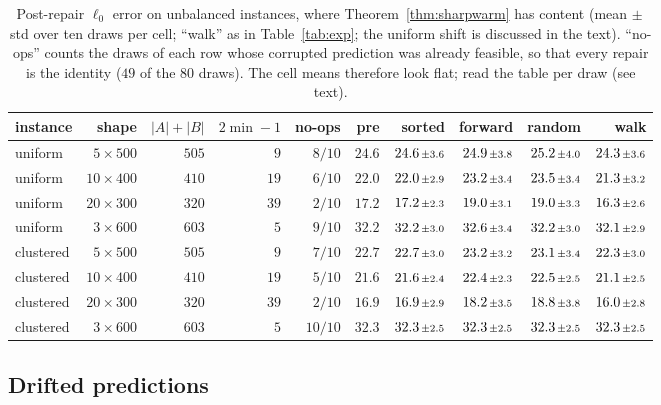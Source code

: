 \begin{table}[ht]
\centering
\caption{Post-repair $\ell_0$ error on unbalanced instances, where Theorem~\ref{thm:sharpwarm} has
content (mean ${\scriptstyle\pm}$\,std over ten draws per cell; ``walk'' as in
Table~\ref{tab:exp}; the uniform shift is discussed in the text). ``no-ops'' counts the draws of
each row whose corrupted prediction was already feasible, so that every repair is the identity
($49$ of the $80$ draws). The cell means therefore look flat; read the table per draw (see
text).}
\label{tab:rect}
\footnotesize
\setlength{\tabcolsep}{2.5pt}
\begin{tabular}{lrrrrrrrrr}
\toprule
instance & shape & $|A|{+}|B|$ & $2\min{-}1$ & no-ops & pre & sorted & forward & random & walk\\
\midrule
uniform & $5\times500$ & $505$ & $9$ & $8/10$ & $24.6$ & $24.6{\scriptstyle\,\pm3.6}$ & $24.9{\scriptstyle\,\pm3.8}$ & $25.2{\scriptstyle\,\pm4.0}$ & $24.3{\scriptstyle\,\pm3.6}$ \\
uniform & $10\times400$ & $410$ & $19$ & $6/10$ & $22.0$ & $22.0{\scriptstyle\,\pm2.9}$ & $23.2{\scriptstyle\,\pm3.4}$ & $23.5{\scriptstyle\,\pm3.4}$ & $21.3{\scriptstyle\,\pm3.2}$ \\
uniform & $20\times300$ & $320$ & $39$ & $2/10$ & $17.2$ & $17.2{\scriptstyle\,\pm2.3}$ & $19.0{\scriptstyle\,\pm3.1}$ & $19.0{\scriptstyle\,\pm3.3}$ & $16.3{\scriptstyle\,\pm2.6}$ \\
uniform & $3\times600$ & $603$ & $5$ & $9/10$ & $32.2$ & $32.2{\scriptstyle\,\pm3.0}$ & $32.6{\scriptstyle\,\pm3.4}$ & $32.2{\scriptstyle\,\pm3.0}$ & $32.1{\scriptstyle\,\pm2.9}$ \\
clustered & $5\times500$ & $505$ & $9$ & $7/10$ & $22.7$ & $22.7{\scriptstyle\,\pm3.0}$ & $23.2{\scriptstyle\,\pm3.2}$ & $23.1{\scriptstyle\,\pm3.4}$ & $22.3{\scriptstyle\,\pm3.0}$ \\
clustered & $10\times400$ & $410$ & $19$ & $5/10$ & $21.6$ & $21.6{\scriptstyle\,\pm2.4}$ & $22.4{\scriptstyle\,\pm2.3}$ & $22.5{\scriptstyle\,\pm2.5}$ & $21.1{\scriptstyle\,\pm2.5}$ \\
clustered & $20\times300$ & $320$ & $39$ & $2/10$ & $16.9$ & $16.9{\scriptstyle\,\pm2.9}$ & $18.2{\scriptstyle\,\pm3.5}$ & $18.8{\scriptstyle\,\pm3.8}$ & $16.0{\scriptstyle\,\pm2.8}$ \\
clustered & $3\times600$ & $603$ & $5$ & $10/10$ & $32.3$ & $32.3{\scriptstyle\,\pm2.5}$ & $32.3{\scriptstyle\,\pm2.5}$ & $32.3{\scriptstyle\,\pm2.5}$ & $32.3{\scriptstyle\,\pm2.5}$ \\
\bottomrule
\end{tabular}
\end{table}

\subsection*{Drifted predictions}

